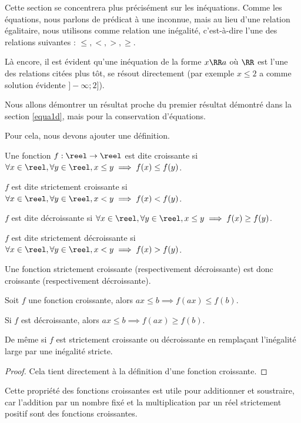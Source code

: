 Cette section se concentrera plus précisément sur les inéquations. Comme les équations, nous parlons de prédicat à une inconnue, mais au lieu d'une relation égalitaire, nous utilisons comme relation une inégalité, c'est-à-dire l'une des relations suivantes : $\leq,<,>,\geq$.

Là encore, il est évident qu'une inéquation de la forme $x\RR a$ où $\RR$ est l'une des relations citées plus tôt, se résout directement (par exemple $x\leq 2$ a comme solution évidente $]-\infty;2]$).

Nous allons démontrer un résultat proche du premier résultat démontré dans la section \ref{equa1d}, mais pour la conservation d'équations.

Pour cela, nous devons ajouter une définition.

\begin{defi}
    Une fonction $f : \reel \to \reel$ est dite croissante si $\forall x\in\reel,\forall y\in\reel, x\leq y \implies f(x)\leq f(y)$.
    
    $f$ est dite strictement croissante si $\forall x\in\reel,\forall y\in\reel, x< y \implies f(x) < f(y)$.
    
    $f$ est dite décroissante si $\forall x\in\reel,\forall y\in\reel, x\leq y \implies f(x)\geq f(y)$.
    
    $f$ est dite strictement décroissante si $\forall x\in\reel,\forall y\in\reel, x< y \implies f(x) > f(y)$.
\end{defi}

\begin{rmk}
    Une fonction strictement croissante (respectivement décroissante) est donc croissante (respectivement décroissante).
\end{rmk}

\begin{prop}
    Soit $f$ une fonction croissante, alors $ax\leq b \implies f(ax)\leq f(b)$.
    
    Si $f$ est décroissante, alors $ax\leq b \implies f(ax)\geq f(b)$.
    
    De même si $f$ est strictement croissante ou décroissante en remplaçant l'inégalité large par une inégalité stricte.
\end{prop}
\begin{proof}
    Cela tient directement à la définition d'une fonction croissante.
\end{proof}

Cette propriété des fonctions croissantes est utile pour additionner et soustraire, car l'addition par un nombre fixé et la multiplication par un réel strictement positif sont des fonctions croissantes.

